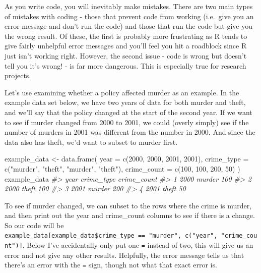 \documentclass[
]{krantz}
\makeatletter
\newenvironment{Shaded}{\begin{snugshade}}{\end{snugshade}}
\newcommand{\AttributeTok}[1]{\textcolor[rgb]{0.61,0.61,0.61}{#1}}
\newcommand{\CommentTok}[1]{\textcolor[rgb]{0.37,0.37,0.37}{\textit{#1}}}
\newcommand{\DecValTok}[1]{\textcolor[rgb]{0.06,0.06,0.06}{#1}}
\newcommand{\FunctionTok}[1]{\textcolor[rgb]{0,0,0}{#1}}
\newcommand{\NormalTok}[1]{#1}
\newcommand{\OtherTok}[1]{\textcolor[rgb]{0.37,0.37,0.37}{#1}}
\newcommand{\StringTok}[1]{\textcolor[rgb]{0.5,0.5,0.5}{#1}}
\newenvironment{kframe}{%
\medskip{}
\setlength{\fboxsep}{.8em}
 \def\at@end@of@kframe{}%
 \ifinner\ifhmode%
  \def\at@end@of@kframe{\end{minipage}}%
  \begin{minipage}{\columnwidth}%
 \fi\fi%
 \def\FrameCommand##1{\hskip\@totalleftmargin \hskip-\fboxsep
 \colorbox{shadecolor}{##1}\hskip-\fboxsep
     \hskip-\linewidth \hskip-\@totalleftmargin \hskip\columnwidth}%
 \MakeFramed {\advance\hsize-\width
   \@totalleftmargin\z@ \linewidth\hsize
   \@setminipage}}%
 {\par\unskip\endMakeFramed%
 \at@end@of@kframe}
\renewenvironment{Shaded}{\begin{kframe}}{\end{kframe}}
\makeatother
\begin{document}
As you write code, you will inevitably make mistakes. There
are two main types of mistakes with coding - those that
prevent code from working (i.e.~give you an error message
and don't run the code) and those that run the code but give
you the wrong result. Of these, the first is probably more
frustrating as R tends to give fairly unhelpful error
messages and you'll feel you hit a roadblock since R just
isn't working right. However, the second issue - code is
wrong but doesn't tell you it's wrong! - is far more
dangerous. This is especially true for research projects.

Let's use examining whether a policy affected murder as an
example. In the example data set below, we have two years of
data for both murder and theft, and we'll say that the
policy changed at the start of the second year. If we want
to see if murder changed from 2000 to 2001, we could (overly
simply) see if the number of murders in 2001 was different
from the number in 2000. And since the data also has theft,
we'd want to subset to murder first.

\begin{Shaded}
\begin{Highlighting}[]
\NormalTok{example\_data }\OtherTok{\textless{}{-}} \FunctionTok{data.frame}\NormalTok{(}
  \AttributeTok{year =} \FunctionTok{c}\NormalTok{(}\DecValTok{2000}\NormalTok{, }\DecValTok{2000}\NormalTok{, }\DecValTok{2001}\NormalTok{, }\DecValTok{2001}\NormalTok{),}
  \AttributeTok{crime\_type =} \FunctionTok{c}\NormalTok{(}\StringTok{"murder"}\NormalTok{, }\StringTok{"theft"}\NormalTok{, }\StringTok{"murder"}\NormalTok{, }\StringTok{"theft"}\NormalTok{),}
  \AttributeTok{crime\_count =} \FunctionTok{c}\NormalTok{(}\DecValTok{100}\NormalTok{, }\DecValTok{100}\NormalTok{, }\DecValTok{200}\NormalTok{, }\DecValTok{50}\NormalTok{)}
\NormalTok{)}
\NormalTok{example\_data}
\CommentTok{\#\textgreater{}   year crime\_type crime\_count}
\CommentTok{\#\textgreater{} 1 2000     murder         100}
\CommentTok{\#\textgreater{} 2 2000      theft         100}
\CommentTok{\#\textgreater{} 3 2001     murder         200}
\CommentTok{\#\textgreater{} 4 2001      theft          50}
\end{Highlighting}
\end{Shaded}

To see if murder changed, we can subset to the rows where
the crime is murder, and then print out the year and
crime\_count columns to see if there is a change. So our
code will be
\texttt{example\_data{[}example\_data\$crime\_type\ ==\ "murder",\ c("year",\ "crime\_count"){]}}.
Below I've accidentally only put one \texttt{=} instead of
two, this will give us an error and not give any other
results. Helpfully, the error message tells us that there's
an error with the \texttt{=} sign, though not what that
exact error is.
\end{document}
